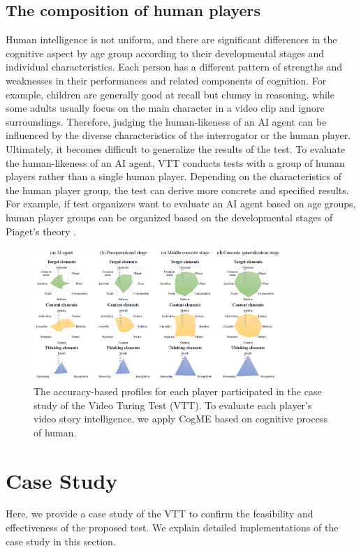 \documentclass[letterpaper]{article} %
\begin{document}
\subsection{The composition of human players}
Human intelligence is not uniform, and there are significant differences in the cognitive aspect by age group according to their developmental stages and individual characteristics. Each person has a different pattern of strengths and weaknesses in their performances and related components of cognition. For example, children are generally good at recall but clumsy in reasoning, while some adults usually focus on the main character in a video clip and ignore surroundings. Therefore, judging the human-likeness of an AI agent can be influenced by the diverse characteristics of the interrogator or the human player. Ultimately, it becomes difficult to generalize the results of the test. To evaluate the human-likeness of an AI agent, VTT conducts tests with a group of human players rather than a single human player. Depending on the characteristics of the human player group, the test can derive more concrete and specified results. For example, if test organizers want to evaluate an AI agent based on age groups, human player groups can be organized based on the developmental stages of Piaget's theory \cite{Piaget1972CogDev}. 

\begin{figure}[t]
\centering
\includegraphics[width=0.85\textwidth]{fig/cogme_analysis.png}
\caption{The accuracy-based profiles for each player participated in the case study of the Video Turing Test (VTT). To evaluate each player's video story intelligence, we apply CogME based on cognitive process of human.}
\label{fig:analysis}
\end{figure}

\section{Case Study}
Here, we provide a case study of the VTT to confirm the feasibility and effectiveness of the proposed test. We explain detailed implementations of the case study in this section.
\end{document}
